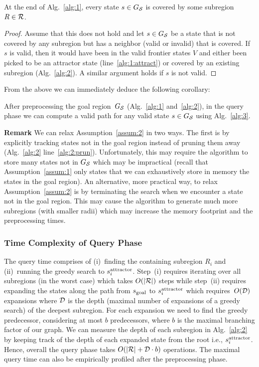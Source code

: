 \documentclass[a4paper,10pt]{article}
\begin{document}
\begin{lemma}
\label{lemma:coverage}
At the end of Alg.~\ref{alg:1}, every state $s \in G_\mathcal{S}$ is covered by some subregion $R \in \mathcal{R}$.
\end{lemma}
\begin{proof}
Assume that this does not hold and let $s \in G_\mathcal{S}$ be a state that is not covered by any subregion but has a neighbor (valid or invalid) that is covered.
%
If $s$ is valid, then it would have been in the valid frontier states $V$ and either been picked to be an attractor state (line~\ref{alg:1:attract}) or covered by an existing subregion (Alg.~\ref{alg:2}).
%
A similar argument holds if $s$ is not valid.
\end{proof}

From the above we can immediately deduce the following corollary:

\vspace{2mm}

\begin{cor}
  After preprocessing the goal region~$G_\mathcal{S}$ (Alg.~\ref{alg:1} and~\ref{alg:2}), in the query phase we can compute a valid path for any valid state $s \in G_\mathcal{S}$ using Alg.~\ref{alg:3}.
\end{cor}


\textbf{Remark}
We can relax Assumption~\ref{assum:2} in two ways.
The first is by explicitly tracking states not in the goal region instead of pruning them away (Alg.~\ref{alg:2} line~\ref{alg:2:prun}).
Unfortunately, this may require the algorithm to store many states not in $G_\mathcal{S}$  which may be impractical (recall that Assumption~\ref{assum:1} only states that we can exhaustively store in memory the states in the goal region).
An alternative, more practical way, to relax Assumption~\ref{assum:2}  is by terminating the search when we  encounter a state not in the goal region.
This may cause the algorithm to generate much more subregions (with smaller radii) which may increase the memory footprint and the preprocessing times.


\subsubsection{Time Complexity of Query Phase}
\label{subsec:complexity}
The query time comprises of 
(i)~finding the containing subregion $R_i$ 
and
(ii)~running the greedy search to $s^{\text{attractor}}_i$.
Step~(i) requires iterating over all subregions (in the worst case) which takes $O(|\mathcal{R}|)$ steps while 
step~(ii) requires expanding the states along the path from $s_{\text{goal}}$ to $s^{\text{attractor}}_i$ which requires~$O(\mathcal{D})$ expansions where $\mathcal{D}$ is the depth (maximal number of expansions of a greedy search) of the deepest subregion. 
For each expansion we need to find the greedy predecessor, considering at most $b$ predecessors, where $b$ is the maximal branching factor of our graph.
We can measure the depth of each subregion in Alg.~\ref{alg:2} by keeping track of the depth of each expanded state from the root i.e., $s^{\text{attractor}}_i$. Hence, overall the query phase takes $O(|\mathcal{R}| + \mathcal{D} \cdot b)$ operations. The maximal query time can also be empirically profiled after the preprocessing phase.
\end{document}
